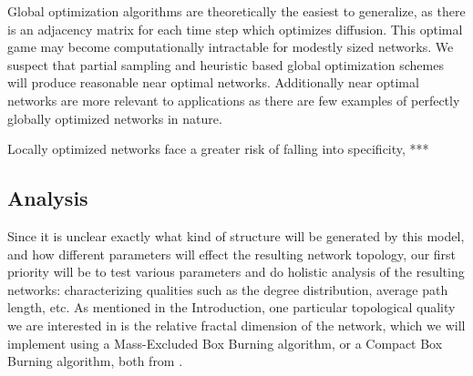 \documentclass{paper}
\begin{document}
	Global optimization algorithms are theoretically the easiest to generalize, as there is an adjacency matrix for each time step which optimizes diffusion. This optimal game may become computationally intractable for modestly sized networks. We suspect that partial sampling and heuristic based global optimization schemes will produce reasonable near optimal networks. Additionally near optimal networks are more relevant to applications as there are few examples of perfectly globally optimized networks in nature.
	
	Locally optimized networks face a greater risk of falling into specificity, ***
	
	\subsection{Analysis}
	Since it is unclear exactly what kind of structure will be generated by this model, and how different parameters will effect the resulting network topology, our first priority will be to test various parameters and do holistic analysis of the resulting networks: characterizing qualities such as the degree distribution, average path length, etc. As mentioned in the Introduction, one particular topological quality we are interested in is the relative fractal dimension of the network, which we will implement using a Mass-Excluded Box Burning algorithm, or a Compact Box Burning algorithm, both from \cite{song_how_2007}. 
	
\end{document}
